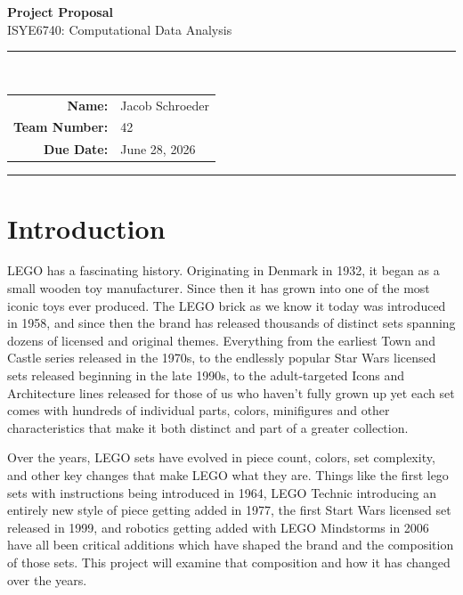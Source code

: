\documentclass[11pt, letterpaper]{article}
\newcommand{\StudentName}{Jacob Schroeder}
\newcommand{\TeamNumber}{42}
\newcommand{\CourseName}{ISYE6740: Computational Data Analysis}
\newcommand{\AssignmentName}{Project Proposal}
\newcommand{\AssignmentDue}{June 28, 2026}
\begin{document}
\thispagestyle{empty}
\begin{center}
    \vspace*{1.5cm}

    {\Huge \textbf{\AssignmentName}}\\[0.6cm]
    {\large \CourseName}\\[0.4cm]
    \rule{0.6\textwidth}{0.8pt}\\[0.8cm]

    \begin{tabular}{>{\bfseries}r l}
        Name:        & \StudentName   \\[4pt]
        Team Number:  & \TeamNumber     \\[4pt]
        Due Date:    & \AssignmentDue \\[4pt]
    \end{tabular}

    \vspace{1.2cm}
    \rule{0.6\textwidth}{0.8pt}
\end{center}

\newpage
\thispagestyle{fancy}
\tableofcontents


\newpage
\section{Introduction}

LEGO has a fascinating history. Originating in Denmark in 1932, it began as a small wooden toy manufacturer. Since then it has grown into one of the most iconic toys ever produced. The LEGO brick as we know it today was introduced in 1958, and since then the brand has released thousands of distinct sets spanning dozens of licensed and original themes. Everything from the earliest Town and Castle series released in the 1970s, to the endlessly popular Star Wars licensed sets released beginning in the late 1990s, to the adult-targeted Icons and Architecture lines released for those of us who haven't fully grown up yet each set comes with hundreds of individual parts, colors, minifigures and other characteristics that make it both distinct and part of a greater collection.

Over the years, LEGO sets have evolved in piece count, colors, set complexity, and other key changes that make LEGO what they are. Things like the first lego sets with instructions being introduced in 1964, LEGO Technic introducing an entirely new style of piece getting added in 1977, the first Start Wars licensed set released in 1999, and robotics getting added with LEGO Mindstorms in 2006 have all been critical additions which have shaped the brand and the composition of those sets. This project will examine that composition and how it has changed over the years.
\end{document}
